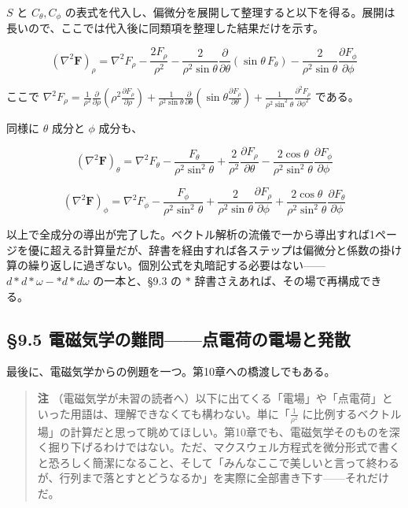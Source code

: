 \documentclass[a4paper,12pt,openany]{book}
\begin{document}
\(S\) と \(C_\theta, C_\phi\)
の表式を代入し、偏微分を展開して整理すると以下を得る。展開は長いので、ここでは代入後に同類項を整理した結果だけを示す。

\[(\nabla^2\mathbf{F})_\rho = \nabla^2 F_\rho - \frac{2F_\rho}{\rho^2} - \frac{2}{\rho^2\sin\theta}\frac{\partial}{\partial\theta}(\sin\theta\,F_\theta) - \frac{2}{\rho^2\sin\theta}\frac{\partial F_\phi}{\partial\phi}\]

ここで
\(\nabla^2 F_\rho = \frac{1}{\rho^2}\frac{\partial}{\partial\rho}\!\left(\rho^2\frac{\partial F_\rho}{\partial\rho}\right) + \frac{1}{\rho^2\sin\theta}\frac{\partial}{\partial\theta}\!\left(\sin\theta\frac{\partial F_\rho}{\partial\theta}\right) + \frac{1}{\rho^2\sin^2\theta}\frac{\partial^2 F_\rho}{\partial\phi^2}\)
である。

同様に \(\theta\) 成分と \(\phi\) 成分も、

\[(\nabla^2\mathbf{F})_\theta = \nabla^2 F_\theta - \frac{F_\theta}{\rho^2\sin^2\theta} + \frac{2}{\rho^2}\frac{\partial F_\rho}{\partial\theta} - \frac{2\cos\theta}{\rho^2\sin^2\theta}\frac{\partial F_\phi}{\partial\phi}\]

\[(\nabla^2\mathbf{F})_\phi = \nabla^2 F_\phi - \frac{F_\phi}{\rho^2\sin^2\theta} + \frac{2}{\rho^2\sin\theta}\frac{\partial F_\rho}{\partial\phi} + \frac{2\cos\theta}{\rho^2\sin^2\theta}\frac{\partial F_\theta}{\partial\phi}\]

以上で全成分の導出が完了した。ベクトル解析の流儀で一から導出すれば1ページを優に超える計算量だが、辞書を経由すれば各ステップは偏微分と係数の掛け算の繰り返しに過ぎない。個別公式を丸暗記する必要はない——\(d\ast d\ast\omega - \ast d\ast d\omega\)
の一本と、§9.3 の \(\ast\) 辞書さえあれば、その場で再構成できる。

\hypertarget{ux96fbux78c1ux6c17ux5b66ux306eux96e3ux554fux70b9ux96fbux8377ux306eux96fbux5834ux3068ux767aux6563}{%
\subsection{§9.5
電磁気学の難問——点電荷の電場と発散}\label{ux96fbux78c1ux6c17ux5b66ux306eux96e3ux554fux70b9ux96fbux8377ux306eux96fbux5834ux3068ux767aux6563}}

最後に、電磁気学からの例題を一つ。第10章への橋渡しでもある。

\begin{quote}
\textbf{注}
（電磁気学が未習の読者へ）以下に出てくる「電場」や「点電荷」といった用語は、理解できなくても構わない。単に「\(\frac{1}{\rho^2}\)
に比例するベクトル場」の計算だと思って眺めてほしい。第10章でも、電磁気学そのものを深く掘り下げるわけではない。ただ、マクスウェル方程式を微分形式で書くと恐ろしく簡潔になること、そして「みんなここで美しいと言って終わるが、行列まで落とすとどうなるか」を実際に全部書き下す——それだけだ。
\end{quote}
\end{document}
